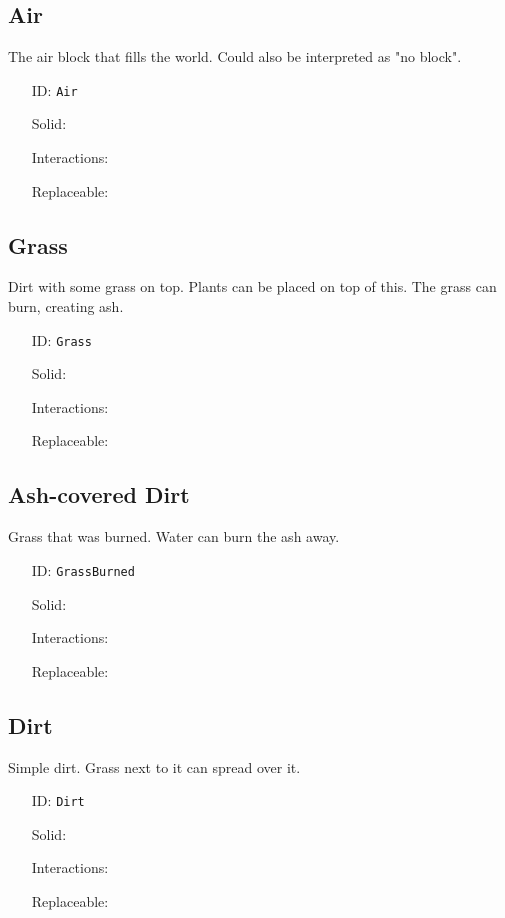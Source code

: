\subsection{Air}\label{subsec:blocks_air}
The air block that fills the world. Could also be interpreted as "no block".
\newline
\begin{itemize}[nosep]
    \item[ID:] \texttt{Air}
    \item[Solid:]  \XSolidBrush \item[Interactions:]  \XSolidBrush \item[Replaceable:]  \Checkmark
\end{itemize}

\subsection{Grass}\label{subsec:blocks_grass}
Dirt with some grass on top. Plants can be placed on top of this.
The grass can burn, creating ash.
\newline
\begin{itemize}[nosep]
    \item[ID:] \texttt{Grass}
    \item[Solid:]  \Checkmark \item[Interactions:]  \XSolidBrush \item[Replaceable:]  \XSolidBrush
\end{itemize}

\subsection{Ash-covered Dirt}\label{subsec:blocks_ash-covered dirt}
Grass that was burned. Water can burn the ash away.
\newline
\begin{itemize}[nosep]
    \item[ID:] \texttt{GrassBurned}
    \item[Solid:]  \Checkmark \item[Interactions:]  \XSolidBrush \item[Replaceable:]  \XSolidBrush
\end{itemize}

\subsection{Dirt}\label{subsec:blocks_dirt}
Simple dirt. Grass next to it can spread over it.
\newline
\begin{itemize}[nosep]
    \item[ID:] \texttt{Dirt}
    \item[Solid:]  \Checkmark \item[Interactions:]  \XSolidBrush \item[Replaceable:]  \XSolidBrush
\end{itemize}

